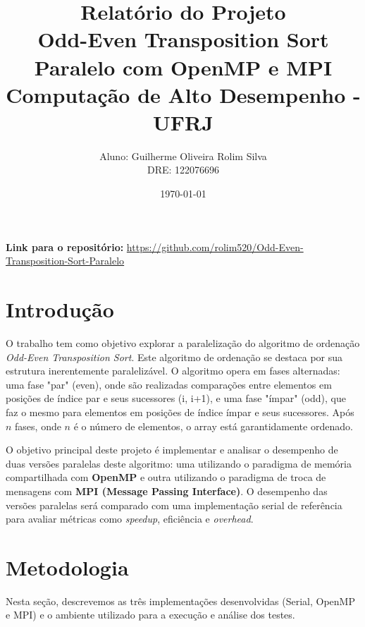 \documentclass[12pt, a4paper]{article}
\title{
    \textbf{Relatório do Projeto} \\
    \vspace{0.2cm}
    \large Odd-Even Transposition Sort Paralelo com OpenMP e MPI \\
    \large Computação de Alto Desempenho - UFRJ
}
\author{
    Aluno: Guilherme Oliveira Rolim Silva \\
    DRE: 122076696
}
\date{\today}
\begin{document}
\maketitle
\thispagestyle{empty}

\begin{center}
    \textbf{Link para o repositório:} \href{https://github.com/rolim520/Odd-Even-Transposition-Sort-Paralelo}{https://github.com/rolim520/Odd-Even-Transposition-Sort-Paralelo}
\end{center}

\section{Introdução}


O trabalho tem como objetivo explorar a paralelização do algoritmo de ordenação \textit{Odd-Even Transposition Sort}. Este algoritmo de ordenação se destaca por sua estrutura inerentemente paralelizável. O algoritmo opera em fases alternadas: uma fase "par" (even), onde são realizadas comparações entre elementos em posições de índice par e seus sucessores (i, i+1), e uma fase "ímpar" (odd), que faz o mesmo para elementos em posições de índice ímpar e seus sucessores. Após $n$ fases, onde $n$ é o número de elementos, o array está garantidamente ordenado.

O objetivo principal deste projeto é implementar e analisar o desempenho de duas versões paralelas deste algoritmo: uma utilizando o paradigma de memória compartilhada com \textbf{OpenMP} e outra utilizando o paradigma de troca de mensagens com \textbf{MPI (Message Passing Interface)}. O desempenho das versões paralelas será comparado com uma implementação serial de referência para avaliar métricas como \textit{speedup}, eficiência e \textit{overhead}.

\section{Metodologia}

Nesta seção, descrevemos as três implementações desenvolvidas (Serial, OpenMP e MPI) e o ambiente utilizado para a execução e análise dos testes.
\end{document}
